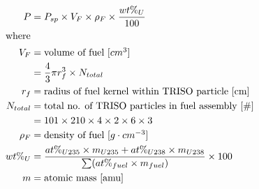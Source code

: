 \begin{align}
    P &= P_{sp} \times V_F \times \rho_F \times \frac{wt\%_{U}}{100} \\
    \intertext{where}
    V_F &= \mbox{volume of fuel [$cm^3$]} \nonumber \\ 
    &= \frac{4}{3} \pi r_f^3 \times N_{total} \nonumber \\
    r_f &= \mbox{radius of fuel kernel within TRISO particle [cm]} \nonumber\\
    N_{total} &= \mbox{total no. of TRISO particles in fuel assembly [$\#$]} \nonumber \\ 
    &= 101 \times 210 \times 4 \times 2 \times 6 \times 3 \nonumber\\ 
    \rho_F &= \mbox{density of fuel [$g \cdot cm^{-3}$]} \nonumber \\
    wt\%_{U} &= \frac{at\%_{U235} \times m_{U235} + at\%_{U238} \times m_{U238}}{\sum (at\%_{fuel} \times m_{fuel})} \times 100 \nonumber\\
    m &= \mbox{atomic mass [amu]} \nonumber
\end{align}

